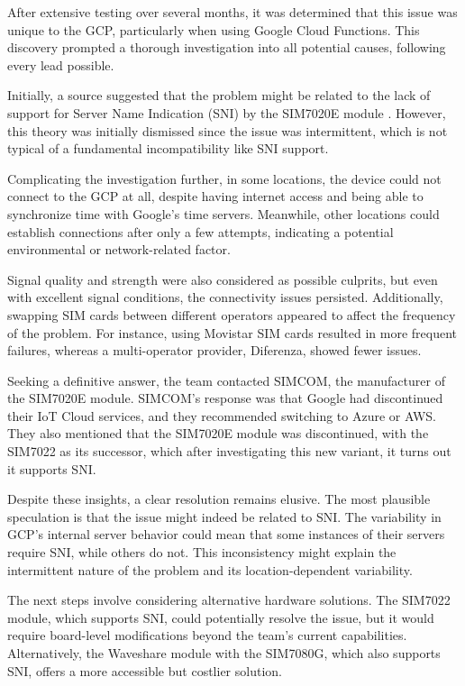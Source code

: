 After extensive testing over several months, it was determined that this issue was unique to the 
GCP, particularly when using Google Cloud Functions. This discovery prompted a thorough 
investigation into all potential causes, following every lead possible.

Initially, a source suggested that the problem might be related to the lack of support for Server 
Name Indication (SNI) by the SIM7020E module \cite{sim7020e_chttpconerror}. However, this theory 
was initially dismissed since the issue was intermittent, which is not typical of a fundamental 
incompatibility like SNI support.

Complicating the investigation further, in some locations, the device could not connect to the GCP 
at all, despite having internet access and being able to synchronize time with Google's time 
servers. Meanwhile, other locations could establish connections after only a few attempts, 
indicating a potential environmental or network-related factor.

Signal quality and strength were also considered as possible culprits, but even with excellent 
signal conditions, the connectivity issues persisted. Additionally, swapping SIM cards between 
different operators appeared to affect the frequency of the problem. For instance, using Movistar 
SIM cards resulted in more frequent failures, whereas a multi-operator provider, Diferenza, showed 
fewer issues.

Seeking a definitive answer, the team contacted SIMCOM, the manufacturer of the SIM7020E module. 
SIMCOM's response was that Google had discontinued their IoT Cloud services, and they recommended 
switching to Azure or AWS. They also mentioned that the SIM7020E module was discontinued, with the 
SIM7022 as its successor, which after investigating this new variant, it turns out it supports SNI.

Despite these insights, a clear resolution remains elusive. The most plausible speculation is that 
the issue might indeed be related to SNI. The variability in GCP's internal server behavior could 
mean that some instances of their servers require SNI, while others do not. This inconsistency 
might explain the intermittent nature of the problem and its location-dependent variability.

The next steps involve considering alternative hardware solutions. The SIM7022 module, which 
supports SNI, could potentially resolve the issue, but it would require board-level modifications 
beyond the team's current capabilities. Alternatively, the Waveshare module with the SIM7080G, 
which also supports SNI, offers a more accessible but costlier solution.
